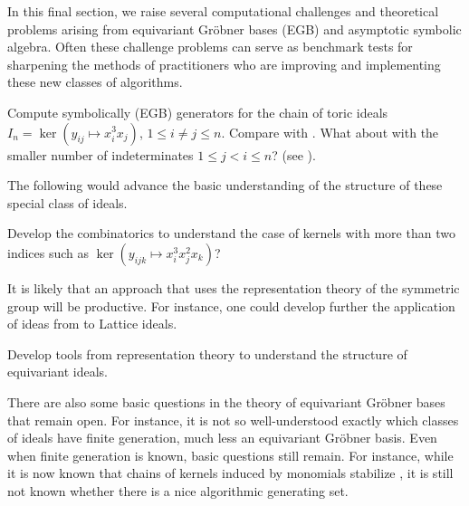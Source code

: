 
In this final section, we raise several computational challenges and theoretical problems arising from equivariant Gr\"obner bases (EGB) and asymptotic symbolic algebra.  Often these challenge problems can serve as benchmark tests for sharpening the methods of practitioners who are improving and implementing these new classes of algorithms.

\begin{problem}
Compute symbolically (EGB) generators for the chain of toric ideals $I_n = \ker(y_{ij} \mapsto x_i^3 x_j)$, $1 \leq i \neq j \leq n$.  Compare with \cite{Hillar13, hillar2016corrigendum, KKL:equivariant-markov, draisma2013noetherianity}.  What about with the smaller number of indeterminates $1 \leq j < i \leq n$?  (see \cite[Remark 6.3]{draisma2013noetherianity}).
\end{problem}

%

The following would advance the basic understanding of the structure of these special class of ideals.

\begin{problem}
Develop the combinatorics to understand the case of kernels with more than two indices such as $\ker(y_{ijk} \mapsto x_i^3 x_j^2 x_k)$?  
\end{problem}

It is likely that an approach that uses the representation theory of the symmetric group will be productive.  For instance, one could develop further the application of ideas from \cite{camina1991some} to Lattice ideals.

\begin{problem}
Develop tools from representation theory to understand the structure of equivariant ideals.
\end{problem}

There are also some basic questions in the theory of equivariant Gr\"obner bases that remain open.  For instance, it is not so well-understood exactly which classes of ideals have finite generation, much less an equivariant Gr\"obner basis.  Even when finite generation is known, basic questions still remain.  For instance, while it is now known that chains of kernels induced by monomials stabilize \cite{aschenbrenner2007finite, KKL:equivariant-markov, draisma2013noetherianity}, it is still not known whether there is a nice algorithmic generating set.

